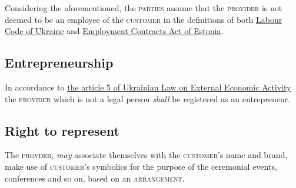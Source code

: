 \begin{Form}
\begin{paracol}{3}
{        Considering the aforementioned, the \textsc{parties} assume that the \textsc{provider} is not deemed to be an employee of the \textsc{customer} in the definitions of both \href{http://zakon2.rada.gov.ua/laws/show/322-08}{Labour Code of Ukraine} and \href{https://www.riigiteataja.ee/en/eli/530102013061/consolide}{Employment Contracts Act of Estonia}.

        \subsection{Entrepreneurship}
        In accordance to \href{http://zakon3.rada.gov.ua/laws/show/959-12/parao138\#o138}{the article 5 of Ukrainian Law on External Economic Activity} the \textsc{provider} which is not a legal person \textit{shall} be registered as an entrepreneur.

        \subsection{Right to represent}
        The \textsc{provder}, \textit{may} associate themselves with the \textsc{customer}'s name and brand, make use of \textsc{customer}'s symbolics for the purpose of the ceremonial events, conferences and so on, based on an \textsc{arrangement}.

}
\end{paracol}
\end{Form}
